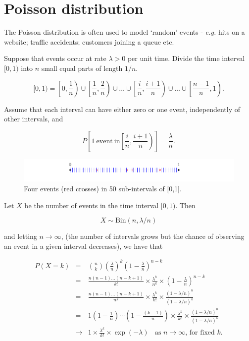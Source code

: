 \documentclass[
]{book}
\begin{document}
\hypertarget{rv:Poisson}{%
\section{Poisson distribution}\label{rv:Poisson}}

The Poisson distribution is often used to model
`random' events - \emph{e.g.} hits on a website; traffic accidents; customers
joining a queue etc.

Suppose that events occur at rate \(\lambda > 0\) per unit time. Divide the time interval \([0,1)\)
into \(n\) small equal parts of length \(1/n\).

\[
[0,1) = \left[ 0, \frac{1}{n} \right) \cup \left[ \frac{1}{n}, \frac{2}{n} \right) \cup \ldots \cup \left[ \frac{i}{n},\frac{i+1}{n} \right)
\cup \ldots \cup \left[ \frac{n-1}{n},1 \right).
\]

Assume that each interval can have either zero or one event, independently of other intervals, and

\[
P \left[ \mathrm{1~event~in} \left[ \frac{i}{n}, \frac{i+1}{n} \right) \right] = \frac{\lambda}{n}.
\]

\begin{figure}
\includegraphics[width=1\linewidth]{Images/pois1} \caption{Four events (red crosses) in 50 sub-intervals of [0,1].}\label{fig:pois1}
\end{figure}

Let \(X\) be the number of events in the time interval \([0,1)\).
Then

\[ X \sim \mathrm{Bin} (n, \lambda/n) \]

and letting \(n \to \infty\), (the number of intervals grows but the chance of observing an event in a given interval decreases), we have that

\begin{eqnarray*}
P (X=k) & = & \binom{n}{k} \left( \frac{\lambda}{n} \right)^{k} \left( 1 - \frac{\lambda}{n}
\right)^{n-k} \\
& = & \frac{n (n-1) \ldots (n-k+1)}{k!} \times \frac{\lambda^{k}}{n^k} \times \left( 1 - \frac{\lambda}{n}
\right)^{n-k} \\
& = & \frac{n (n-1) \ldots (n-k+1)}{n^k} \times \frac{\lambda^{k}}{k!}\times
\frac{ (1 - \lambda / n)^n}{(1 - \lambda / n )^k}  \\
& = & 1 \left(1 - \frac{1}{n} \right) \cdots \left(1 - \frac{(k-1)}{n} \right) \times \frac{\lambda^k}{k!}
\times \frac{ (1 - \lambda / n)^n}{(1 - \lambda / n )^k}  \\
& \rightarrow & 1 \times  \frac{\lambda^k}{k!} \times \exp(-\lambda)
\; \; \mbox{ as $n \to \infty$, for fixed $k$}.
\end{eqnarray*}
\end{document}
